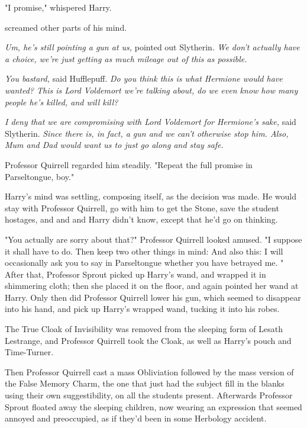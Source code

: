 "I promise," whispered Harry.

 screamed other parts of his mind.

\emph{Um, he's still pointing a gun at us,} pointed out Slytherin. \emph{We
don't actually have a choice, we're just getting as much mileage out of this as
possible.}

\emph{You bastard,} said Hufflepuff. \emph{Do you think this is what Hermione
would have wanted? This is Lord Voldemort we're talking about, do we even know
how many people he's killed, and will kill?}

\emph{I deny that we are compromising with Lord Voldemort for Hermione's sake,}
said Slytherin. \emph{Since there is, in fact, a gun and we can't otherwise
stop him. Also, Mum and Dad would want us to just go along and stay safe.}

Professor Quirrell regarded him steadily. "Repeat the full promise in
Parseltongue, boy."

 Harry's mind was settling, composing
itself, as the decision was made. He would stay with Professor Quirrell, go
with him to get the Stone, save the student hostages, and{\el} and{\el}
and Harry didn't know, except that he'd go on thinking.

"You actually are sorry about that?" Professor Quirrell looked amused. "I
suppose it shall have to do. Then keep two other things in mind:  And also this: I
will occasionally ask you to say in Parseltongue whether you have betrayed me.
"
\sbreak
After that, Professor Sprout picked up Harry's wand, and wrapped it in
shimmering cloth; then she placed it on the floor, and again pointed her wand
at Harry. Only then did Professor Quirrell lower his gun, which seemed to
disappear into his hand, and pick up Harry's wrapped wand, tucking it into his
robes.

The True Cloak of Invisibility was removed from the sleeping form of Lesath
Lestrange, and Professor Quirrell took the Cloak, as well as Harry's pouch and
Time-Turner.

Then Professor Quirrell cast a mass Obliviation followed by the mass version of
the False Memory Charm, the one that just had the subject fill in the blanks
using their own suggestibility, on all the students present. Afterwards
Professor Sprout floated away the sleeping children, now wearing an expression
that seemed annoyed and preoccupied, as if they'd been in some Herbology
accident.

